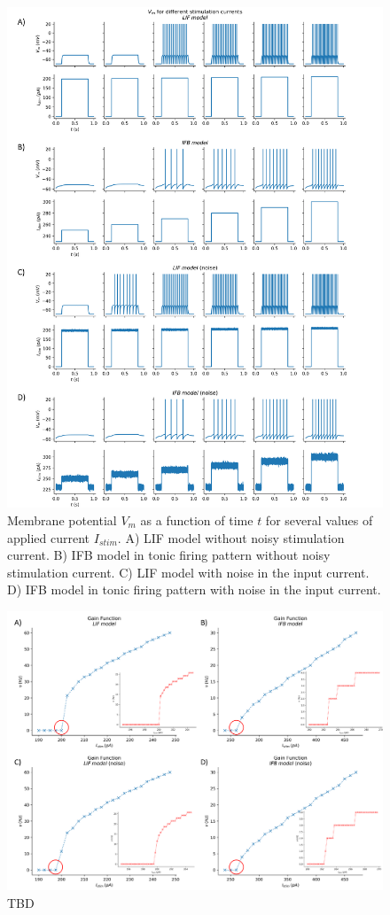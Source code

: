 \documentclass[11pt]{article}
\begin{document}
\begin{figure}
    \includegraphics[scale=0.065]{Vm}
    \centering
    \caption{Membrane potential \(V_{m}\) as a function of time \(t\) for several
    values of applied current \(I_{stim}\). A) LIF model without noisy stimulation current.
    B) IFB model in tonic firing pattern without noisy stimulation current. C) LIF model with
    noise in the input current. D) IFB model in tonic firing pattern with noise in the input current.}
    \label{fig:Vm}
\end{figure}

\begin{figure}
    \includegraphics[scale=0.065]{gain}
    \centering
    \caption{TBD}
    \label{fig:gain}
\end{figure}
\end{document}
